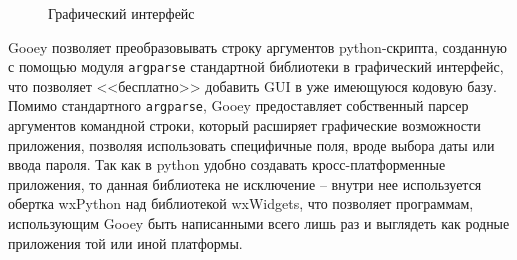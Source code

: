 \begin{figure}[!htbp]
    \caption{Графический интерфейс {\ProgModule}\label{fig:apndv-gooey}}
\end{figure}

Gooey позволяет преобразовывать строку аргументов python-скрипта, созданную с помощью
модуля \verb|argparse| стандартной библиотеки в графический интерфейс, что позволяет
<<бесплатно>> добавить GUI в уже имеющуюся кодовую базу.
Помимо стандартного \verb|argparse|, Gooey предоставляет собственный парсер аргументов
командной строки, который расширяет графические возможности приложения, позволяя
использовать специфичные поля, вроде выбора даты или ввода пароля.
Так как в python удобно создавать кросс-платформенные приложения, то
данная библиотека не исключение -- внутри нее используется
обертка wxPython над библиотекой wxWidgets, что позволяет программам, использующим
Gooey быть написанными всего лишь раз и выглядеть как родные приложения той или иной
платформы.

%        

